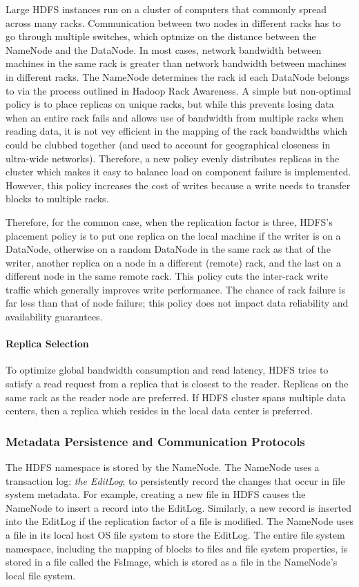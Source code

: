 \documentclass{article}
\begin{document}
Large HDFS instances run on a cluster of computers that commonly spread across many racks. Communication between two nodes in different racks has to go through multiple switches, which optmize on the distance between the NameNode and the DataNode. In most cases, network bandwidth between machines in the same rack is greater than network bandwidth between machines in different racks. The NameNode determines the rack id each DataNode belongs to via the process outlined in Hadoop Rack Awareness. A simple but non-optimal policy is to place replicas on unique racks, but while this prevents losing data when an entire rack fails and allows use of bandwidth from multiple racks when reading data, it is not vey efficient in the mapping of the rack bandwidths which could be clubbed together (and used to account for geographical closeness in ultra-wide networks). Therefore, a new policy evenly distributes replicas in the cluster which makes it easy to balance load on component failure is implemented. However, this policy increases the cost of writes because a write needs to transfer blocks to multiple racks.

Therefore, for the common case, when the replication factor is three, HDFS’s placement policy is to put one replica on the local machine if the writer is on a DataNode, otherwise on a random DataNode in the same rack as that of the writer, another replica on a node in a different (remote) rack, and the last on a different node in the same remote rack. This policy cuts the inter-rack write traffic which generally improves write performance. The chance of rack failure is far less than that of node failure; this policy does not impact data reliability and availability guarantees. 

\paragraph{Replica Selection} To optimize global bandwidth consumption and read latency, HDFS tries to satisfy a read request from a replica that is closest to the reader. Replicas on the same rack as the reader node are preferred. If HDFS cluster spans multiple data centers, then a replica which resides in the local data center is preferred.

\subsubsection{Metadata Persistence and Communication Protocols}

The HDFS namespace is stored by the NameNode. The NameNode uses a transaction log: \textit{the EditLog}; to persistently record the changes that occur in file system metadata. For example, creating a new file in HDFS causes the NameNode to insert a record into the EditLog. Similarly, a new record is inserted into the EditLog if the replication factor of a file is modified. The NameNode uses a file in its local host OS file system to store the EditLog. The entire file system namespace, including the mapping of blocks to files and file system properties, is stored in a file called the FsImage, which is stored as a file in the NameNode’s local file system.
\end{document}
